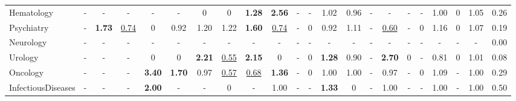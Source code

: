 \begin{landscape}
\begin{table}[H]
\begin{tabular}{l||ccccccccccc||cc||ccccc||cc||c}
Hematology             &         - &              - &                 - &                 - &                 - &          \tiny{0} &          \tiny{0} &     \textbf{1.28} &     \textbf{2.56} &                 - &                 - &           1.02 &              0.96 &              - &                 - &                 - &                 - &              1.00 &          \tiny{0} &        1.05 &    0.26 \\
Psychiatry             &         - &  \textbf{1.73} &  \underline{0.74} &          \tiny{0} &              0.92 &              1.20 &              1.22 &     \textbf{1.60} &  \underline{0.74} &                 - &          \tiny{0} &           0.92 &              1.11 &              - &  \underline{0.60} &                 - &          \tiny{0} &              1.16 &          \tiny{0} &        1.07 &    0.19 \\
Neurology              &         - &              - &                 - &                 - &                 - &                 - &                 - &                 - &                 - &                 - &                 - &              - &                 - &              - &                 - &                 - &                 - &                 - &                 - &           - &    0.00 \\
Urology                &         - &              - &                 - &          \tiny{0} &          \tiny{0} &     \textbf{2.21} &  \underline{0.55} &     \textbf{2.15} &          \tiny{0} &                 - &          \tiny{0} &  \textbf{1.28} &              0.90 &              - &     \textbf{2.70} &          \tiny{0} &                 - &              0.81 &          \tiny{0} &        1.01 &    0.08 \\
Oncology               &         - &              - &                 - &     \textbf{3.40} &     \textbf{1.70} &              0.97 &  \underline{0.57} &  \underline{0.68} &     \textbf{1.36} &                 - &          \tiny{0} &           1.00 &              1.00 &              - &              0.97 &                 - &          \tiny{0} &              1.09 &                 - &        1.00 &    0.29 \\
InfectiousDiseases     &         - &              - &                 - &     \textbf{2.00} &                 - &                 - &          \tiny{0} &                 - &              1.00 &                 - &                 - &  \textbf{1.33} &          \tiny{0} &              - &              1.00 &                 - &                 - &              1.00 &                 - &        1.00 &    0.50 \\

\end{tabular}
\end{table}
\end{landscape}
